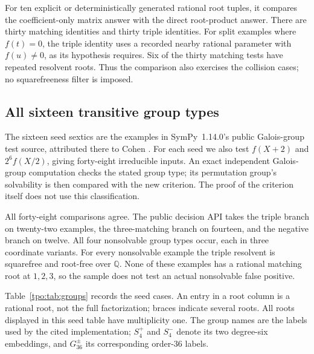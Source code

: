\documentclass[11pt,letterpaper]{article}
\numberwithin{equation}{section}
\theoremstyle{definition}
\theoremstyle{remark}
\newcommand{\QQ}{\mathbb Q}
\begin{document}
For ten explicit or deterministically generated rational root tuples, it
compares the coefficient-only matrix answer with the direct root-product
answer. There are thirty matching identities and thirty triple identities.
For split examples where $f(t)=0$, the triple identity uses a recorded nearby
rational parameter with $f(u)\ne0$, as its hypothesis requires. Six of the
thirty matching tests have repeated resolvent roots. Thus the comparison also
exercises the collision cases; no squarefreeness filter is imposed.

\subsection{All sixteen transitive group types}
The sixteen seed sextics are the examples in SymPy~1.14.0's public Galois-group
test source, attributed there to Cohen \cite{tpo:sympy-tests,tpo:cohen}. For each seed
we also test $f(X+2)$ and $2^6f(X/2)$, giving forty-eight irreducible inputs.
An exact independent Galois-group computation checks the stated group type;
its permutation group's solvability is then compared with the new criterion.
The proof of the criterion itself does not use this classification.

All forty-eight comparisons agree. The public decision API takes the triple
branch on twenty-two examples, the three-matching branch on fourteen, and the
negative branch on twelve. All four nonsolvable group types occur, each in
three coordinate variants. For every nonsolvable example the triple resolvent
is squarefree and root-free over $\QQ$. None of these examples has a rational
matching root at $1,2,3$, so the sample does not test an actual nonsolvable
false positive.

Table~\ref{tpo:tab:groups} records the seed cases. An entry in a root column is a
rational root, not the full factorization; braces indicate several roots.
All roots displayed in this seed table have multiplicity one. The group names
are the labels used by the cited implementation; $S_4^+$ and $S_4^-$ denote its
two degree-six embeddings, and $G_{36}^\pm$ its corresponding order-$36$
labels.
\end{document}
